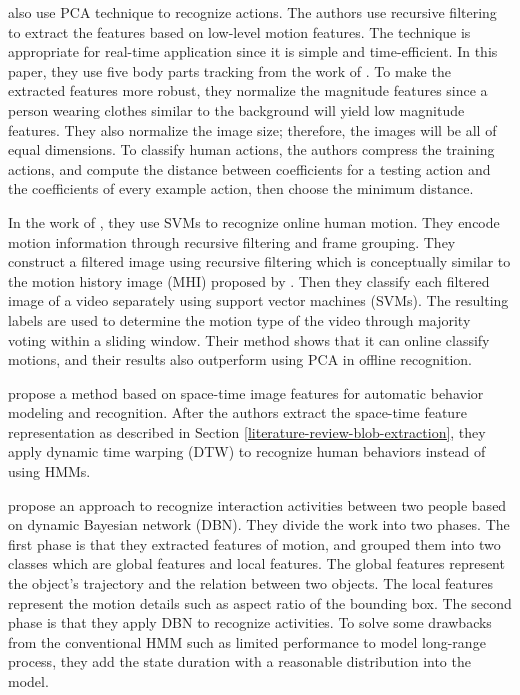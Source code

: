  also use PCA technique to recognize
actions. The authors use recursive filtering to extract the features
based on low-level motion features. The technique is appropriate for
real-time application since it is simple and time-efficient. In this
paper, they use five body parts tracking from the work
of . To make the extracted features more
robust, they normalize the magnitude features since a person wearing
clothes similar to the background will yield low magnitude
features. They also normalize the image size; therefore, the images
will be all of equal dimensions. To classify human actions, the
authors compress the training actions, and compute the distance
between coefficients for a testing action and the coefficients of
every example action, then choose the minimum distance.

In the work of , they use SVMs to recognize
online human motion. They encode motion information through recursive
filtering and frame grouping. They construct a filtered image using
recursive filtering which is conceptually similar to the motion
history image (MHI) proposed by . Then they
classify each filtered image of a video separately using support
vector machines (SVMs). The resulting labels are used to determine the
motion type of the video through majority voting within a sliding
window. Their method shows that it can online classify motions, and
their results also outperform using PCA in offline recognition.

 propose a method based on space-time image
features for automatic behavior modeling and recognition. After the
authors extract the space-time feature representation as described in
Section \ref{literature-review-blob-extraction}, they apply dynamic time 
warping (DTW) to
recognize human behaviors instead of using HMMs.

 propose an approach to recognize interaction
activities between two people based on dynamic Bayesian network
(DBN). They divide the work into two phases. The first phase is that
they extracted features of motion, and grouped them into two classes
which are global features and local features. The global features
represent the object's trajectory and the relation between two
objects. The local features represent the motion details such as
aspect ratio of the bounding box. The second phase is that they apply
DBN to recognize activities. To solve some drawbacks from the
conventional HMM such as limited performance to model long-range
process, they add the state duration with a reasonable distribution
into the model.


